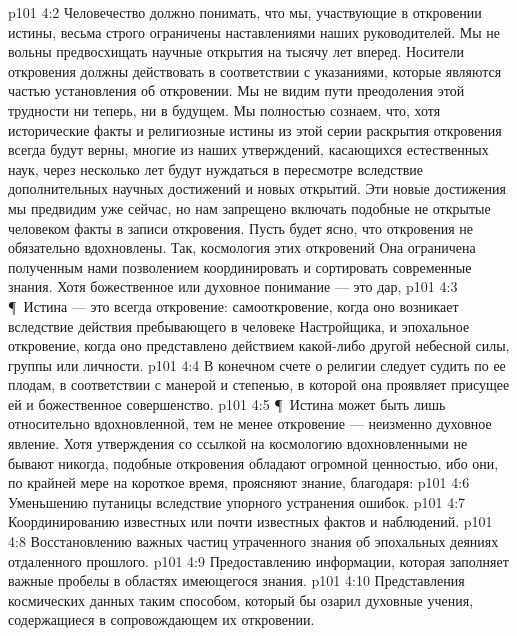 \vs p101 4:2 Человечество должно понимать, что мы, участвующие в откровении истины, весьма строго ограничены наставлениями наших руководителей. Мы не вольны предвосхищать научные открытия на тысячу лет вперед. Носители откровения должны действовать в соответствии с указаниями, которые являются частью установления об откровении. Мы не видим пути преодоления этой трудности ни теперь, ни в будущем. Мы полностью сознаем, что, хотя исторические факты и религиозные истины из этой серии раскрытия откровения всегда будут верны, многие из наших утверждений, касающихся естественных наук, через несколько лет будут нуждаться в пересмотре вследствие дополнительных научных достижений и новых открытий. Эти новые достижения мы предвидим уже сейчас, но нам запрещено включать подобные не открытые человеком факты в записи откровения. Пусть будет ясно, что откровения не обязательно вдохновлены. Так, космология этих откровений  Она ограничена полученным нами позволением координировать и сортировать современные знания. Хотя божественное или духовное понимание --- это дар, 
\vs p101 4:3 \P\ Истина --- это всегда откровение: самооткровение, когда оно возникает вследствие действия пребывающего в человеке Настройщика, и эпохальное откровение, когда оно представлено действием какой\hyp{}либо другой небесной силы, группы или личности.
\vs p101 4:4 В конечном счете о религии следует судить по ее плодам, в соответствии с манерой и степенью, в которой она проявляет присущее ей и божественное совершенство.
\vs p101 4:5 \P\ Истина может быть лишь относительно вдохновленной, тем не менее откровение --- неизменно духовное явление. Хотя утверждения со ссылкой на космологию вдохновленными не бывают никогда, подобные откровения обладают огромной ценностью, ибо они, по крайней мере на короткое время, проясняют знание, благодаря:
\vs p101 4:6 \bibnobreakspace Уменьшению путаницы вследствие упорного устранения ошибок.
\vs p101 4:7 \bibnobreakspace Координированию известных или почти известных фактов и наблюдений.
\vs p101 4:8 \bibnobreakspace Восстановлению важных частиц утраченного знания об эпохальных деяниях отдаленного прошлого.
\vs p101 4:9 \bibnobreakspace Предоставлению информации, которая заполняет важные пробелы в областях имеющегося знания.
\vs p101 4:10 \bibnobreakspace Представления космических данных таким способом, который бы озарил духовные учения, содержащиеся в сопровождающем их откровении.
